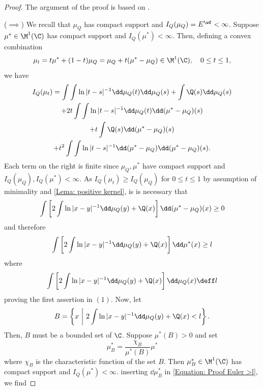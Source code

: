 \begin{proof}
	The argument of the proof is based on  \cite{deiftorthogonal}. 
	
	($\implies$) We recall that $\mu_Q$ has compact support and $I_Q(\mu_Q) = E^\wf < \infty$. Suppose $\mu^* \in \M^1(\C)$ has compact support and $I_Q(\mu^*) < \infty$. Then, defining a convex combination
	\begin{equation}
		\mu_t = t \mu^* + (1-t) \mu_Q = \mu_Q + t (\mu^* - \mu_Q) \in \M^1(\C), \quad 0 \leq t \leq 1,
	\end{equation}
	we have
	\begin{multline}
		I_Q(\mu_t) = \int \int \ln |t - s|^{-1} \dd \mu_Q(t) \dd \mu_Q(s) + \int \Q(s) \dd  \mu_Q(s) \\
		+ 2t \int \int \ln |t - s|^{-1} \dd \mu_Q(t) \dd (\mu^* - \mu_Q)(s) \\
		+ t  \int \Q(s) \dd  (\mu^* - \mu_Q) (s) \\
		+ t^2 \int \int \ln |t - s|^{-1} \dd (\mu^* - \mu_Q) \dd (\mu^* - \mu_Q)(s).
	\end{multline}
	Each term on the right is finite since $\mu_Q, \mu^*$ have compact support and $I_Q (\mu_Q), I_Q(\mu^*) < \infty$. As $I_Q(\mu_t) \geq I_Q (\mu_Q)$ for $0 \leq t \leq 1$ by assumption of minimality and \autoref{Lema: positive kernel}, is is necessary that
	\begin{equation}
		\int \left[ 2 \int \ln{|x-y|^{-1}} \dd \mu_Q(y) + \Q(x) \right] \dd (\mu^* - \mu_Q)(x) \geq 0
		\label{Equation: Proof Euler >0}
	\end{equation}   
	and therefore
	\begin{equation}
		\int \left[ 2 \int \ln{|x-y|^{-1}} \dd \mu_Q(y) + \Q(x) \right] \dd \mu^*(x) \geq l
		\label{Equation: Proof Euler >l}
	\end{equation}
	where
	\begin{equation}
		\int \left[ 2 \int \ln{|x-y|^{-1}} \dd \mu_Q(y) + \Q(x) \right] \dd \mu_Q(x) \deff l
	\end{equation}
	proving the first assertion in $(1)$. Now, let
	\begin{equation}
		B = \left\{ x \ \bigg| \ 2 \int \ln{|x-y|^{-1}} \dd \mu_Q(y) + \Q(x) < l \right\}.
	\end{equation}
	Then, $B$ must be a bounded set of $\C$. Suppose $\mu^*(B) > 0$ and set
	\begin{equation}
		\mu^*_B = \frac{\chi_B}{\mu^*(B)} \mu^*
	\end{equation}
	where $\chi_B$ is the characteristic function of the set $B$. Then $\mu^*_B \in \M^1(\C)$ has compact support and $I_Q(\mu^*) < \infty$. inserting $\dd \mu^*_B$ in \eqref{Equation: Proof Euler >l}, we find

\end{proof}
